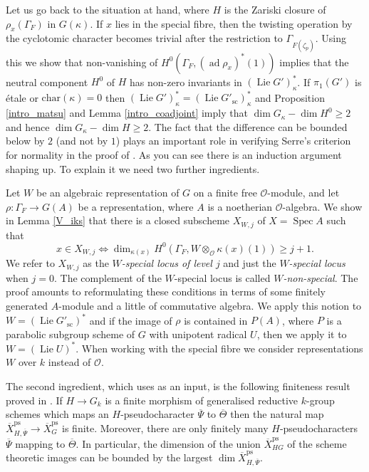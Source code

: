 \documentclass{amsart}
\theoremstyle{definition}
\theoremstyle{remark}
\DeclareMathOperator{\Spec}{Spec}
\newcommand{\OO}{\mathcal O}
\DeclareMathOperator{\ad}{ad}
\newcommand{\ps}{\mathrm{ps}}
\newcommand{\Xbar}{\overline{X}}
\DeclareMathOperator{\Lie}{Lie}
\newcommand{\chara}{\mathrm{char}}
\newcommand{\Thetabar}{\overline{\Theta}}
\newcommand{\sic}{\operatorname{sc}}
\begin{document}
Let us go back to the situation at hand, where $H$ is the Zariski closure 
of $\rho_x(\Gamma_F)$ in $G(\kappa)$. If $x$ lies in the special fibre, then the
twisting operation by the cyclotomic character becomes trivial after the restriction to $\Gamma_{F(\zeta_p)}$. Using this we show that non-vanishing 
of $H^0(\Gamma_F, (\ad \rho_x)^*(1))$ implies that the neutral component
$H^0$ of $H$ has non-zero invariants in $(\Lie G')^*_{\kappa}$. 
If $\pi_1(G')$ is \'etale or $\chara(\kappa)=0$ then 
$(\Lie G')^*_{\kappa} =(\Lie G'_{\sic})^*_{\kappa}$ and 
Proposition 
\ref{intro_matsu} and Lemma \ref{intro_coadjoint} imply that $\dim G_{\kappa}-\dim H^0\ge 2$ and hence $\dim G_{\kappa}- \dim H \ge 2$.
The fact that the difference can be bounded below by $2$ (and not by $1$) plays
an important role in verifying Serre's criterion for normality in the proof of 
. As you can see there is an induction argument shaping up. To explain it we need two further ingredients. 

Let $W$ be an  algebraic representation of $G$ on a finite free $\OO$-module, and let $\rho: \Gamma_F \rightarrow G(A)$ be a
representation, where $A$ is a noetherian $\OO$-algebra. We show in Lemma \ref{V_iks} that there is a closed  subscheme $X_{W,j}$ of 
$X=\Spec A$ such that 
$$x\in X_{W,j} \iff \dim_{\kappa(x)} H^0(\Gamma_F, W\otimes_{\OO} \kappa(x)(1))\ge j+1.$$ 
We refer to $X_{W,j}$ as the \emph{$W$-special locus of level $j$} and just the \emph{$W$-special locus} when $j=0$. 
The complement of the $W$-special locus is called \emph{$W$-non-special}.
The proof amounts to reformulating these conditions in terms of some finitely generated $A$-module and a little of commutative algebra. We apply this 
notion to $W=(\Lie G'_{\sic})^*$ and if the image of $\rho$ is contained in $P(A)$, where $P$ is a parabolic subgroup scheme 
of $G$ with unipotent radical $U$, then we apply it to $W=(\Lie U)^*$. When working with the special fibre we consider representations $W$ over $k$
instead of $\OO$.

The second ingredient, which uses  as an input, is the following finiteness result proved in .
If $H\rightarrow G_k$ is a finite morphism of generalised reductive $k$-group schemes which maps an $H$-pseudocharacter $\overline{\Psi}$ to $\Thetabar$ then 
the natural map $\Xbar^{\ps}_{H, \overline{\Psi}} \rightarrow \Xbar^{\ps}_G$
is finite. Moreover, there are only finitely many $H$-pseudocharacters $\overline{\Psi}$ mapping to $\Thetabar$.
In particular, the dimension of the union $\Xbar^{\ps}_{HG}$ of the scheme theoretic images can be bounded by the largest $\dim \Xbar^{\ps}_{H,\overline{\Psi}}$.
\end{document}
